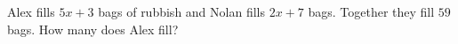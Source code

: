 Alex fills $5x+3$ bags of rubbish and Nolan fills $2x+7$ bags. Together they fill $59$ bags. How many does Alex fill?
